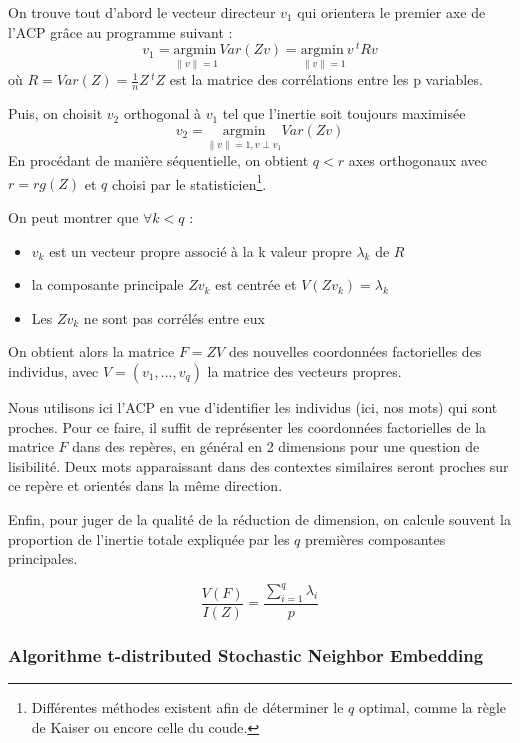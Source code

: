 \documentclass[11pt,french,french]{article}
\let\rmarkdownfootnote\footnote%
\def\footnote{\protect\rmarkdownfootnote}
\begin{document}
On trouve tout d'abord le vecteur directeur \(v_1\) qui orientera le
premier axe de l'ACP grâce au programme suivant :
\[v_1 =\underset{ \left\| v  \right\| = 1}{\mathrm{argmin~}} Var(Zv) =\underset{ \left\| v  \right\| = 1}{\mathrm{argmin~}} v\,^t R v \]
où \(R = Var(Z) = \frac{1}{n} Z\,^t Z\) est la matrice des corrélations
entre les p variables.

Puis, on choisit \(v_2\) orthogonal à \(v_1\) tel que l'inertie soit
toujours maximisée
\[v_2 =\underset{ \left\| v  \right\| = 1, v \perp v_1}{\mathrm{argmin}} Var(Zv) \]
En procédant de manière séquentielle, on obtient \(q < r\) axes
orthogonaux avec \(r = rg(Z)\) et \(q\) choisi par le
statisticien\footnote{Différentes méthodes existent afin de déterminer
  le \(q\) optimal, comme la règle de Kaiser ou encore celle du coude.}.

On peut montrer que \(\forall k < q\) :

\begin{itemize}
\item $v_k$ est un vecteur propre associé à la k\ieme{} valeur propre $\lambda_k$ de $R$
\item la composante principale $Zv_k$ est centrée et $V(Zv_k)= \lambda_k$
\item Les $Zv_k$ ne sont pas corrélés entre eux
\end{itemize}

On obtient alors la matrice \(F = ZV\) des nouvelles coordonnées
factorielles des individus, avec \(V = (v_1,\dots,v_q)\) la matrice des
vecteurs propres.

Nous utilisons ici l'ACP en vue d'identifier les individus (ici, nos
mots) qui sont proches. Pour ce faire, il suffit de représenter les
coordonnées factorielles de la matrice \(F\) dans des repères, en
général en 2 dimensions pour une question de lisibilité. Deux mots
apparaissant dans des contextes similaires seront proches sur ce repère
et orientés dans la même direction.

Enfin, pour juger de la qualité de la réduction de dimension, on calcule
souvent la proportion de l'inertie totale expliquée par les \(q\)
premières composantes principales.

\[ \frac{V(F)}{I(Z)} = \frac{\sum \limits_{i = 1}^q \lambda_i}{p}\]

\hypertarget{algorithme-t-distributed-stochastic-neighbor-embedding}{%
\subsubsection{Algorithme t-distributed Stochastic Neighbor
Embedding}\label{algorithme-t-distributed-stochastic-neighbor-embedding}}
\end{document}
